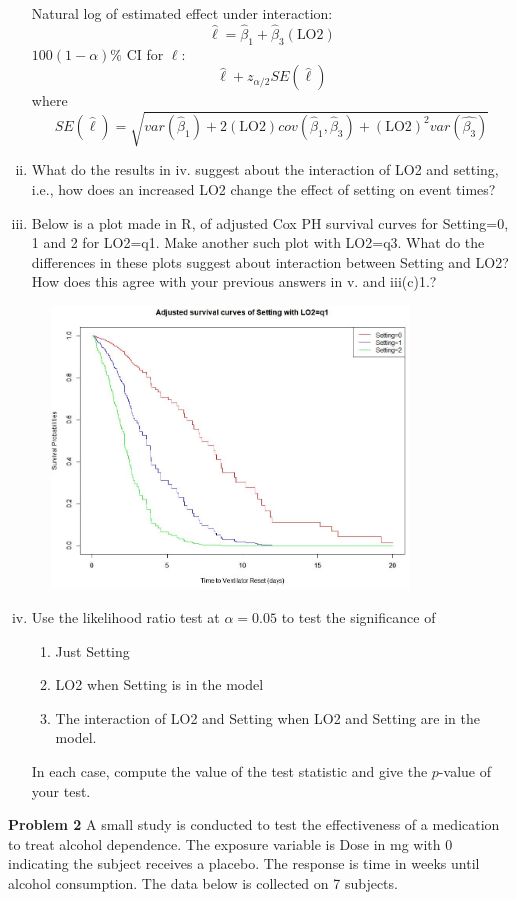 \documentclass[12pt]{article}
\begin{document}
\begin{enumerate}[i.]
    Natural log of estimated effect under interaction:
    \[
    \hat{\ell} =\hat{\beta}_1 + \hat{\beta}_3(\text{LO2})
    \]
   $100(1-\alpha)\%$ CI for $\ell$:
   \[
   \hat{\ell} + z_{\alpha/2}SE(\hat{\ell})
   \]
   where
   \[
   SE(\hat{\ell}) = \sqrt{var(\hat{\beta}_1)+2(\text{LO2})cov(\hat{\beta}_1,\hat{\beta}_3)+(\text{LO2})^2var(\hat{\beta_3})}
   \]
\item What do the results in iv. suggest about the interaction of LO2 and setting, i.e., how does an increased LO2 change the effect of setting on event times?
\item Below is a plot made in R, of adjusted Cox PH survival curves for Setting=0, 1 and 2 for LO2=q1. Make another such plot with LO2=q3. What do the differences in these plots suggest about interaction between Setting and LO2? How does this agree with your previous answers in v. and iii(c)1.?
    \begin{center}
\includegraphics[width =10.5cm, height=7.5cm]{HW2AdjSurv.JPG}
\end{center}
\item Use the likelihood ratio test at $\alpha=0.05$ to test the significance of 
\begin{enumerate}[1.] 
\item Just Setting
\item  LO2 when Setting is in the model
 \item The interaction of LO2 and Setting when LO2 and Setting are in the model.
 \end{enumerate}
 In each case, compute the value of the test statistic and give the $p$-value of your test.
\end{enumerate}
\textbf{Problem 2}
A small study is conducted to test the effectiveness of a medication to treat alcohol dependence. The exposure variable is Dose in mg with 0 indicating the subject receives a placebo.   The response is time in weeks until alcohol consumption. The data below is collected on 7 subjects.
\end{document}
